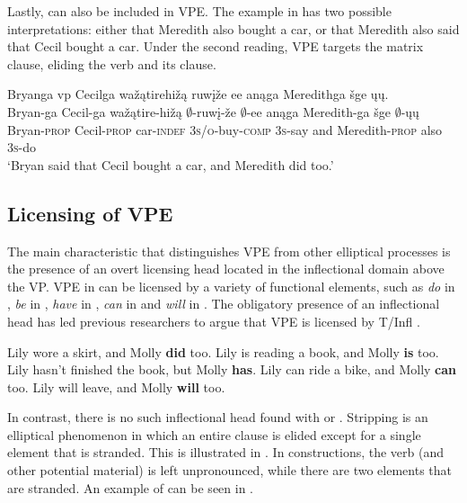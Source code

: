 \documentclass[output=paper]{LSP/langsci}
\begin{document}
Lastly,   can also be included in VPE. The example in  has two possible interpretations: either that Meredith also bought a car, or that Meredith also said that Cecil bought a car. Under the second reading, VPE targets the matrix clause, eliding the verb and its  clause.
 
\ea\label{ex:johnson:11} 
\glll Bryanga {\ob}{vp} Cecilga wažątirehižą ruwįže ee{\cb} anąga Meredithga šge {\ob}ųų{\cb}.\\
Bryan-ga {} Cecil-ga wažątire-hižą $\emptyset$-ruwį-že $\emptyset$-ee anąga Meredith-ga šge {\db}$\emptyset$-ųų\\
Bryan-\textsc{prop} {} Cecil-\textsc{prop} car-\textsc{indef} \textsc{3s/o}-buy-\textsc{comp} \textsc{3s}-say and Meredith-\textsc{prop} also {\db}\textsc{3s}-do\\
\trans `Bryan said that Cecil bought a car, and Meredith did too.'
\z


\subsection{Licensing of VPE}\label{sec:johnson:2.2}

The main characteristic that distinguishes VPE from other elliptical processes is the presence of an overt licensing head located in the inflectional domain above the VP. VPE in  can be licensed by a variety of functional elements, such as \emph{do} in , \emph{be} in , \emph{have} in , \emph{can} in  and \emph{will} in . The obligatory presence of an inflectional head has led previous researchers to argue that VPE is licensed by T/Infl \citep{Bresnan1976,Sag1976,Zagona1988,Lobeck1995}.

 
\ea\label{ex:johnson:12}
\ea\label{ex:johnson:12a}
Lily wore a skirt, and Molly \textbf{did} too.
\ex\label{ex:johnson:12b}
Lily is reading a book, and Molly \textbf{is} too.
\ex\label{ex:johnson:12c}
Lily hasn't finished the book, but Molly \textbf{has}.
\ex\label{ex:johnson:12d}
Lily can ride a bike, and Molly \textbf{can} too.
\ex\label{ex:johnson:12e} 
Lily will leave, and Molly \textbf{will} too.
\z
\z

In contrast, there is no such inflectional head found with  or . Stripping is an elliptical phenomenon in which an entire clause is elided except for a single element that is stranded. This is illustrated in . In  constructions, the verb (and other potential material) is left unpronounced, while there are two elements that are stranded. An example of  can be seen in .
 
\end{document}
